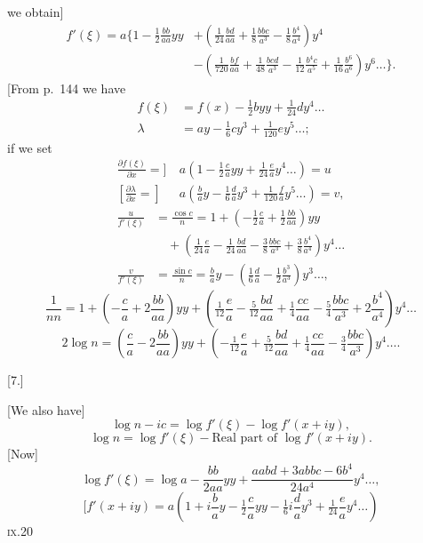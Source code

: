 \noindent we obtain]
\[
\begin{aligned}
f'(\xi)=a\biggl\{1-\tfrac12\frac{bb}{aa}yy
 &+\left(\tfrac1{24}\frac{bd}{aa}+\tfrac18\frac{bbc}{a^3}-\tfrac18\frac{b^4}{a^4}\right)y^4\\
 &-\left(\tfrac1{720}\frac{bf}{aa}+\tfrac1{48}\frac{bcd}{a^3}
 -\tfrac1{12}\frac{b^4c}{a^5}+\tfrac1{16}\frac{b^6}{a^6}\right)y^6\ldots\biggr\}.
\end{aligned}
\]
[From p.\ 144 we have
\[
\begin{aligned}
f(\xi)&=f(x)-\tfrac12byy+\tfrac1{24}dy^4\ldots\\
\lambda&=ay-\tfrac16cy^3+\tfrac1{120}ey^5\ldots;
\end{aligned}
\]
\noindent if we set
\[
\begin{aligned}
\frac{\partial f(\xi)}{\partial x}={]}&\ a\left(1-\tfrac12\frac ca yy+\tfrac1{24}\frac ea y^4\ldots\right)=u\\
\left[\frac{\partial\lambda}{\partial x}={}\right]&\ a\left(\frac ba y-\tfrac16\frac da y^3+\tfrac1{120}\frac fa y^5\ldots\right)=v,
\end{aligned}
\]
\noindent [then]
\[
\begin{aligned}
\frac{u}{f'(\xi)}&=\frac{\cos c}{n}=1+\left(-\tfrac12\frac ca+\tfrac12\frac{bb}{aa}\right)yy\\
 &\quad+\left(\tfrac1{24}\frac ea-\tfrac1{24}\frac{bd}{aa}-\tfrac38\frac{bbc}{a^3}
 +\tfrac38\frac{b^4}{a^4}\right)y^4\ldots\\
\frac{v}{f'(\xi)}&=\frac{\sin c}{n}=\frac ba y
-\left(\tfrac16\frac da-\tfrac12\frac{b^3}{a^3}\right)y^3\ldots,
\end{aligned}
\]
\[
\frac1{nn}=1+\left(-\frac ca+2\frac{bb}{aa}\right)yy
+\left(\tfrac1{12}\frac ea-\tfrac5{12}\frac{bd}{aa}+\tfrac14\frac{cc}{aa}
-\tfrac54\frac{bbc}{a^3}+2\frac{b^4}{a^4}\right)y^4\ldots
\]
\noindent [and]
\[
2\log n=\left(\frac ca-2\frac{bb}{aa}\right)yy
+\left(-\tfrac1{12}\frac ea+\tfrac5{12}\frac{bd}{aa}+\tfrac14\frac{cc}{aa}
-\tfrac34\frac{bbc}{a^3}\right)y^4\ldots.
\]

\begin{center}[7.]\end{center}
[We also have]
\[
\log n-ic=\log f'(\xi)-\log f'(x+iy),
\]
\noindent [hence]
\[
\log n=\log f'(\xi)-\text{Real part of }\log f'(x+iy).
\]
[Now]
\[
\log f'(\xi)=\log a-\frac{bb}{2aa}yy+\frac{aabd+3abbc-6b^4}{24a^4}y^4\ldots,
\]
\[
[f'(x+iy)=a\left(1+i\frac ba y-\tfrac12\frac ca yy-\tfrac16i\frac da y^3
+\tfrac1{24}\frac ea y^4\ldots\right)
\]
\noindent\textsc{ix.}\hfill 20\hspace*{.12\linewidth}\par

